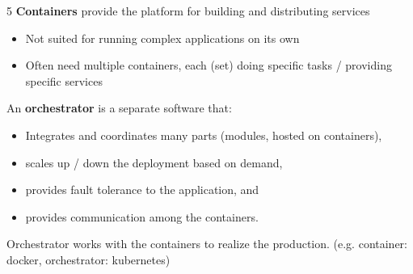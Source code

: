 \documentclass[landscape,a4paper]{extarticle}
\begin{document}
\begin{multicols*}{5}
    \textbf{Containers} provide the platform for building and distributing services
    \begin{itemize}
        \item Not suited for running complex applications on its own
        \item Often need multiple containers, each (set) doing specific tasks / providing specific services
    \end{itemize}

    An \textbf{orchestrator} is a separate software that:
    \begin{itemize}
        \item Integrates and coordinates many parts (modules, hosted on containers),
        \item scales up / down the deployment based on demand,
        \item provides fault tolerance to the application, and
        \item provides communication among the containers.
    \end{itemize}

    Orchestrator works with the containers to realize the production. (e.g. container: docker, orchestrator: kubernetes)


\end{multicols*}
\end{document}
